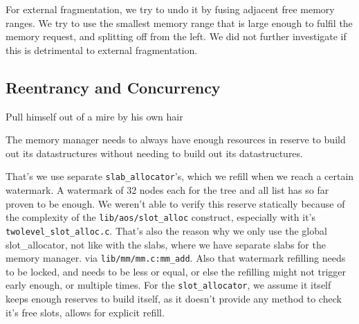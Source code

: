 For external fragmentation, we try to undo it by fusing adjacent free memory
ranges.
We try to use the smallest memory range that is large enough to fulfil the
memory request, and splitting off from the left.
We did not further investigate if this is detrimental to external fragmentation.

% 
% 
% 

\subsection{Reentrancy and Concurrency}\label{mem-con}

\begin{displayquote}
Pull himself out of a mire by his own hair
\end{displayquote}

The memory manager needs to always have enough resources in reserve to build out
its datastructures without needing to build out its datastructures.

That's we use separate \verb|slab_allocator|'s, which we refill when we reach a
certain watermark.
A watermark of 32 nodes each for the tree and all list has so far proven to be
enough.
We weren't able to verify this reserve statically because of the complexity of the
\verb|lib/aos/slot_alloc| construct, especially with it's
\verb|twolevel_slot_alloc.c|.
That's also the reason why we only use the global slot\_allocator, not like with
the slabs, where we have separate slabs for the memory manager.
via \verb|lib/mm/mm.c:mm_add|.
Also that watermark refilling needs to be locked, and needs to be less or equal,
or else the refilling might not trigger early enough, or multiple times.
For the \verb|slot_allocator|, we assume it itself keeps enough reserves to build
itself, as it doesn't provide any method to check it's free slots, allows for
explicit refill.

